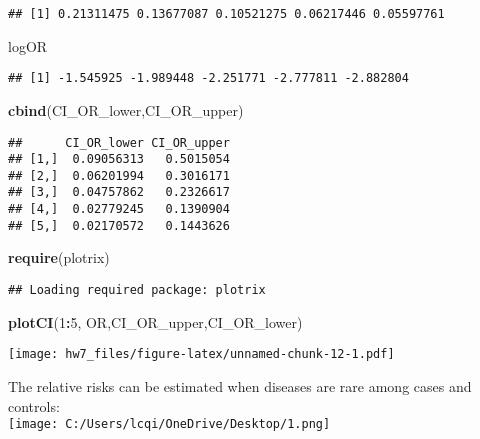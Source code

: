 \documentclass[]{article}
\newenvironment{Shaded}{\begin{snugshade}}{\end{snugshade}}
\newcommand{\KeywordTok}[1]{\textcolor[rgb]{0.13,0.29,0.53}{\textbf{#1}}}
\newcommand{\DecValTok}[1]{\textcolor[rgb]{0.00,0.00,0.81}{#1}}
\newcommand{\OperatorTok}[1]{\textcolor[rgb]{0.81,0.36,0.00}{\textbf{#1}}}
\newcommand{\NormalTok}[1]{#1}
\begin{document}
\begin{verbatim}
## [1] 0.21311475 0.13677087 0.10521275 0.06217446 0.05597761
\end{verbatim}

\begin{Shaded}
\begin{Highlighting}[]
\NormalTok{logOR}
\end{Highlighting}
\end{Shaded}

\begin{verbatim}
## [1] -1.545925 -1.989448 -2.251771 -2.777811 -2.882804
\end{verbatim}

\begin{Shaded}
\begin{Highlighting}[]
\KeywordTok{cbind}\NormalTok{(CI_OR_lower,CI_OR_upper)}
\end{Highlighting}
\end{Shaded}

\begin{verbatim}
##      CI_OR_lower CI_OR_upper
## [1,]  0.09056313   0.5015054
## [2,]  0.06201994   0.3016171
## [3,]  0.04757862   0.2326617
## [4,]  0.02779245   0.1390904
## [5,]  0.02170572   0.1443626
\end{verbatim}

\begin{Shaded}
\begin{Highlighting}[]
\KeywordTok{require}\NormalTok{(plotrix)}
\end{Highlighting}
\end{Shaded}

\begin{verbatim}
## Loading required package: plotrix
\end{verbatim}

\begin{Shaded}
\begin{Highlighting}[]
\KeywordTok{plotCI}\NormalTok{(}\DecValTok{1}\OperatorTok{:}\DecValTok{5}\NormalTok{, OR,CI_OR_upper,CI_OR_lower)}
\end{Highlighting}
\end{Shaded}

\texttt{[image: hw7\_files/figure-latex/unnamed-chunk-12-1.pdf]}

The relative risks can be estimated when diseases are rare among cases
and controls:\\
\texttt{[image: C:/Users/lcqi/OneDrive/Desktop/1.png]}
\end{document}
